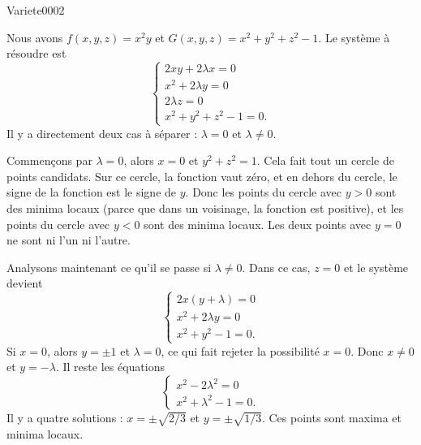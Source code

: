 
\begin{corrige}{Variete0002}

	Nous avons $f(x,y,z)=x^2y$ et $G(x,y,z)=x^2+y^2+z^2-1$. Le système à résoudre est
	\begin{equation}
		\left\{
		\begin{array}{ll}
			2xy+2\lambda x=0\\
			x^2+2\lambda y=0\\
			2\lambda z=0\\
			x^2+y^2+z^2-1=0.
		\end{array}
		\right.
	\end{equation}
	Il y a directement deux cas à séparer : $\lambda=0$ et $\lambda\neq 0$. 
	
	Commençons par $\lambda=0$, alors $x=0$ et $y^2+z^2=1$. Cela fait tout un cercle de points candidats. Sur ce cercle, la fonction vaut zéro, et en dehors du cercle, le signe de la fonction est le signe de $y$. Donc les points du cercle avec $y>0$ sont des minima locaux (parce que dans un voisinage, la fonction est positive), et les points du cercle avec $y<0$ sont des minima locaux. Les deux points avec $y=0$ ne sont ni l'un ni l'autre.

	Analysons maintenant ce qu'il se passe si $\lambda\neq 0$. Dans ce cas, $z=0$ et le système devient
	\begin{equation}
		\left\{
		\begin{array}{ll}
			2x(y+\lambda)=0\\
			x^2+2\lambda y=0\\
			x^2+y^2-1=0.
		\end{array}
		\right.
	\end{equation}
	Si $x=0$, alors $y=\pm 1$ et $\lambda=0$, ce qui fait rejeter la possibilité $x=0$. Donc $x\neq 0$ et $y=-\lambda$. Il reste les équations
	\begin{equation}
		\left\{
		\begin{array}{ll}
			x^2-2\lambda^2=0\\
			x^2+\lambda^2-1=0.
		\end{array}
		\right.
	\end{equation}
	Il y a quatre solutions : $x=\pm\sqrt{2/3}$ et $y=\pm\sqrt{1/3}$. Ces points sont maxima et minima locaux.

\end{corrige}
